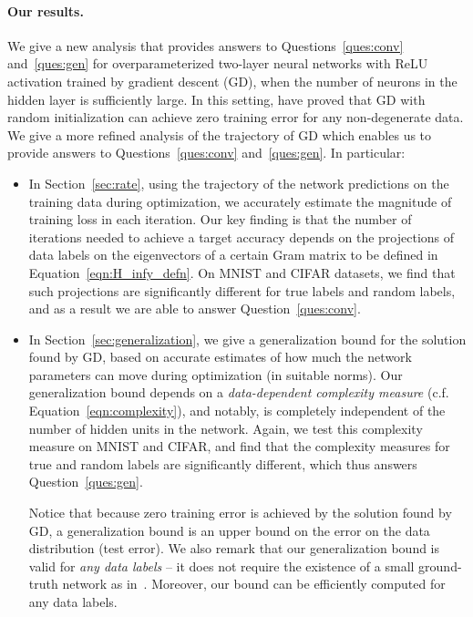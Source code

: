 \paragraph{Our results.}
We give a new analysis that provides answers to Questions~\ref{ques:conv} and~\ref{ques:gen} for overparameterized two-layer neural networks with ReLU activation trained by gradient descent (GD), when the number of neurons in the hidden layer is sufficiently large.
In this setting, \citet{du2018provably} have proved that GD with random initialization can achieve zero training error for any non-degenerate data.
We give a more refined analysis of the trajectory of GD which enables us to provide answers to Questions~\ref{ques:conv} and~\ref{ques:gen}.
In particular:
\begin{itemize}
\item In Section~\ref{sec:rate}, using the trajectory of the network predictions on the training data during optimization, we accurately estimate the magnitude of training loss in each iteration.
Our key finding is that the number of iterations needed to achieve a target accuracy depends on the projections of data labels on the eigenvectors of a certain Gram matrix to be defined in Equation~\eqref{eqn:H_infy_defn}.
On MNIST and CIFAR datasets, we find that such projections are significantly different for true labels and random labels, and as a result we are able to answer Question~\ref{ques:conv}.

\item In Section~\ref{sec:generalization}, we give a generalization bound for the solution found by GD, based on accurate estimates of how much the network parameters can move during optimization (in suitable norms).
Our generalization bound depends on a \emph{data-dependent complexity measure} (c.f. Equation~\eqref{eqn:complexity}), and notably, is completely independent of the number of hidden units in the network.
Again, we test this complexity measure on MNIST and CIFAR, and find that the complexity measures for true and random labels are significantly different, which thus answers Question~\ref{ques:gen}.

Notice that because zero training error is achieved by the solution found by GD, a generalization bound is an upper bound on the error on the data distribution (test error).
We also remark that our generalization bound is valid for \emph{any data labels} -- it does not require the existence of a small ground-truth network as in~\citep{allen2018learning}.
Moreover, our bound can be efficiently computed for any data labels. 


\end{itemize}
